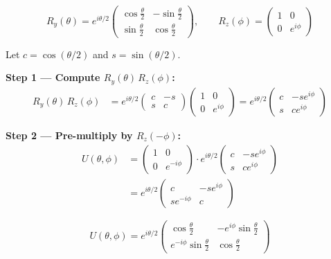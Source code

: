\documentclass[12pt,a4paper]{article}
\begin{document}
\[
  R_y(\theta)=e^{i\theta/2}
  \begin{pmatrix}\cos\tfrac{\theta}{2}&-\sin\tfrac{\theta}{2}\\[4pt]
                  \sin\tfrac{\theta}{2}& \cos\tfrac{\theta}{2}\end{pmatrix},
  \qquad
  R_z(\phi)=\begin{pmatrix}1&0\\0&e^{i\phi}\end{pmatrix}
\]

Let $c=\cos(\theta/2)$ and $s=\sin(\theta/2)$.

\medskip
\textbf{Step 1 --- Compute $R_y(\theta)\,R_z(\phi)$:}
\begin{align*}
R_y(\theta)\,R_z(\phi)
  &= e^{i\theta/2}\begin{pmatrix}c&-s\\s&c\end{pmatrix}
     \begin{pmatrix}1&0\\0&e^{i\phi}\end{pmatrix}
   = e^{i\theta/2}\begin{pmatrix}c & -se^{i\phi}\\[4pt]s & ce^{i\phi}\end{pmatrix}
\end{align*}

\textbf{Step 2 --- Pre-multiply by $R_z(-\phi)$:}
\begin{align*}
U(\theta,\phi)
  &= \begin{pmatrix}1&0\\0&e^{-i\phi}\end{pmatrix}
     \cdot e^{i\theta/2}\begin{pmatrix}c & -se^{i\phi}\\[4pt]s & ce^{i\phi}\end{pmatrix} \\[8pt]
  &= e^{i\theta/2}
     \begin{pmatrix}c & -se^{i\phi}\\[4pt]se^{-i\phi} & c\end{pmatrix}
\end{align*}

\[
  \boxed{U(\theta,\phi)=e^{i\theta/2}
    \begin{pmatrix}
      \cos\tfrac{\theta}{2} & -e^{i\phi}\sin\tfrac{\theta}{2}\\[6pt]
      e^{-i\phi}\sin\tfrac{\theta}{2} & \cos\tfrac{\theta}{2}
    \end{pmatrix}}
\]
\end{document}
